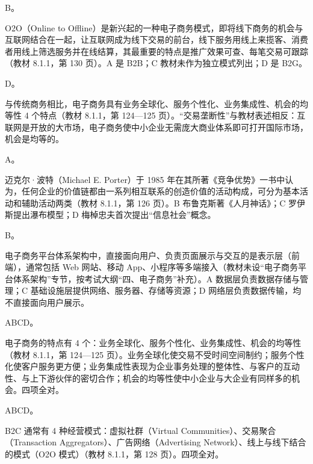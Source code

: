 \documentclass[a4paper,11pt]{article}
\begin{document}
\q B。\begin{analysis}O2O（Online to Offline）是新兴起的一种电子商务模式，即将线下商务的机会与互联网结合在一起，让互联网成为线下交易的前台，线下服务用线上来揽客、消费者用线上筛选服务并在线结算，其最重要的特点是推广效果可查、每笔交易可跟踪（教材 8.1.1，第 130 页）。A 是 B2B；C 教材未作为独立模式列出；D 是 B2G。\end{analysis}

\q D。\begin{analysis}与传统商务相比，电子商务具有业务全球化、服务个性化、业务集成性、机会的均等性 4 个特点（教材 8.1.1，第 124—125 页）。“交易垄断性”与教材表述相反：互联网是开放的大市场，电子商务使中小企业无需庞大商业体系即可打开国际市场，机会是均等的。\end{analysis}

\q A。\begin{analysis}迈克尔·波特（Michael E. Porter）于 1985 年在其所著《竞争优势》一书中认为，任何企业的价值链都由一系列相互联系的创造价值的活动构成，可分为基本活动和辅助活动两类（教材 8.1.1，第 126 页）。B 布鲁克斯著《人月神话》；C 罗伊斯提出瀑布模型；D 梅棹忠夫首次提出“信息社会”概念。\end{analysis}

\q B。\begin{analysis}电子商务平台体系架构中，直接面向用户、负责页面展示与交互的是表示层（前端），通常包括 Web 网站、移动 App、小程序等多端接入（教材未设“电子商务平台体系架构”专节，按考试大纲“四、电子商务”补充）。A 数据层负责数据存储与管理；C 基础设施层提供网络、服务器、存储等资源；D 网络层负责数据传输，均不直接面向用户展示。\end{analysis}


\q ABCD。\begin{analysis}电子商务的特点有 4 个：业务全球化、服务个性化、业务集成性、机会的均等性（教材 8.1.1，第 124—125 页）。业务全球化使交易不受时间空间制约；服务个性化使客户服务更方便；业务集成性表现为企业事务处理的整体性、与客户的互动性、与上下游伙伴的密切合作；机会的均等性使中小企业与大企业有同样多的机会。四项全对。\end{analysis}

\q ABCD。\begin{analysis}B2C 通常有 4 种经营模式：虚拟社群（Virtual Communities）、交易聚合（Transaction Aggregators）、广告网络（Advertising Network）、线上与线下结合的模式（O2O 模式）（教材 8.1.1，第 128 页）。四项全对。\end{analysis}
\end{document}
